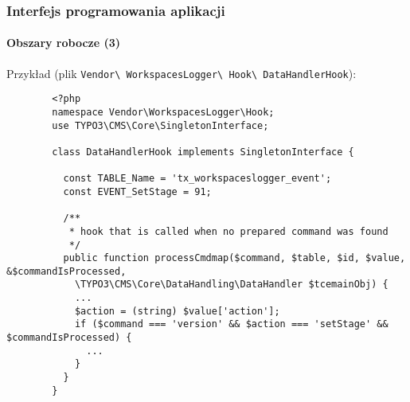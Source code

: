 
\begin{frame}[fragile]
	\frametitle{Interfejs programowania aplikacji}
	\framesubtitle{Obszary robocze (3)}

	Przykład (plik \texttt{Vendor\textbackslash
		WorkspacesLogger\textbackslash
		Hook\textbackslash
		DataHandlerHook}):

	\lstset{
		basicstyle=\tiny\ttfamily
	}

	\begin{lstlisting}
		<?php
		namespace Vendor\WorkspacesLogger\Hook;
		use TYPO3\CMS\Core\SingletonInterface;

		class DataHandlerHook implements SingletonInterface {

		  const TABLE_Name = 'tx_workspaceslogger_event';
		  const EVENT_SetStage = 91;

		  /**
		   * hook that is called when no prepared command was found
		   */
		  public function processCmdmap($command, $table, $id, $value, &$commandIsProcessed,
		    \TYPO3\CMS\Core\DataHandling\DataHandler $tcemainObj) {
		    ...
		    $action = (string) $value['action'];
		    if ($command === 'version' && $action === 'setStage' && $commandIsProcessed) {
		      ...
		    }
		  }
		}
	\end{lstlisting}

\end{frame}


